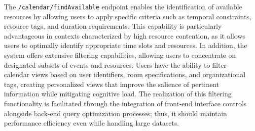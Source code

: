 The \texttt{/calendar/findAvailable} endpoint enables the identification of available resources by allowing users to apply specific criteria such as temporal constraints, resource tags, and duration requirements.
This capability is particularly advantageous in contexts characterized by high resource contention, as it allows users to optimally identify appropriate time slots and resources.
In addition, the system offers extensive filtering capabilities, allowing users to concentrate on designated subsets of events and resources.
Users have the ability to filter calendar views based on user identifiers, room specifications, and organizational tags, creating personalized views that improve the salience of pertinent information while mitigating cognitive load.
The realization of this filtering functionality is facilitated through the integration of front-end interface controls alongside back-end query optimization processes; thus, it should maintain performance efficiency even while handling large datasets.
